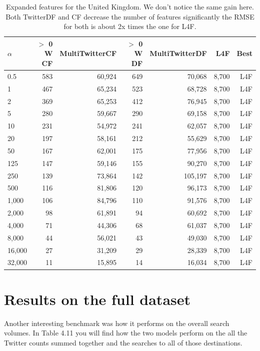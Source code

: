 \documentclass[minf,twoside,singlespacing,parskip,frontabs]{infthesis}
\begin{document}
\begin{table}[]
\begin{center}
\begin{tabular}{ l | r | r | r | r | r | r}
$\alpha$ & $>$ 0 W CF & MultiTwitterCF & $>$ 0 W DF & MultiTwitterDF & L4F & Best\\
\hline
0.5 & 583 & 60,924 & 649 & 70,068 & 8,700 & L4F\\
1 & 467 & 65,234 & 523 & 68,728 & 8,700 & L4F\\
2 & 369 & 65,253 & 412 & 76,945 & 8,700 & L4F\\
5 & 280 & 59,667 & 290 & 69,158 & 8,700 & L4F\\
10 & 231 & 54,972 & 241 & 62,057 & 8,700 & L4F\\
20 & 197 & 58,161 & 212 & 55,629 & 8,700 & L4F\\
50 & 167 & 62,001 & 175 & 77,956 & 8,700 & L4F\\
125 & 147 & 59,146 & 155 & 90,270 & 8,700 & L4F\\
250 & 139 & 73,864 & 142 & 105,197 & 8,700 & L4F\\
500 & 116 & 81,806 & 120 & 96,173 & 8,700 & L4F\\
1,000 & 106 & 84,796 & 110 & 91,576 & 8,700 & L4F\\
2,000 & 98 & 61,891 & 94 & 60,692 & 8,700 & L4F\\
4,000 & 71 & 44,306 & 68 & 61,037 & 8,700 & L4F\\
8,000 & 44 & 56,021 & 43 & 49,030 & 8,700 & L4F\\
16,000 & 27 & 31,209 & 29 & 28,339 & 8,700 & L4F\\
32,000 & 11 & 15,895 & 14 & 16,034 & 8,700 & L4F\\
\end{tabular}
\end{center}
\caption{Expanded features for the United Kingdom. We don't notice the same gain here. Both TwitterDF and CF decrease the number of features significantly the RMSE for both is about 2x times the one for L4F.}
\label{uk}
\end{table}

\newpage
\section{Results on the full dataset}

Another interesting benchmark was how it performs on the overall search volumes. In Table 4.11 you will find how the two models perform on the all the Twitter counts summed together and the searches to all of those destinations.
\end{document}
